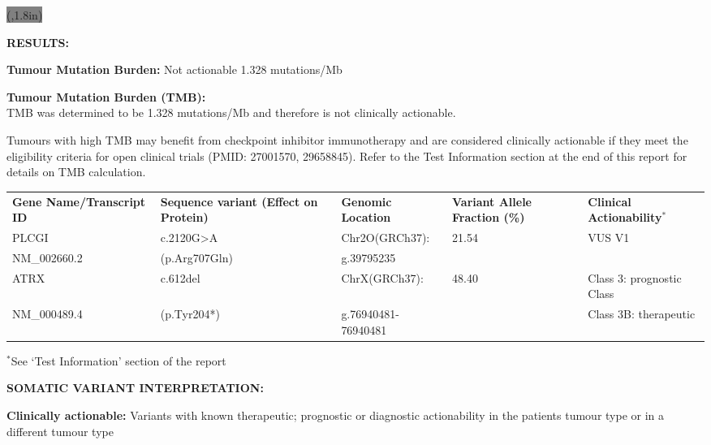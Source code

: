 \documentclass[8pt,letterpaper]{extarticle}
\begin{document}
\newpage

\colorbox{gray}{\makebox(\textwidth,1.8in){}}

{\bf \large RESULTS:}


{\bf Tumour Mutation Burden:}\hspace{2em} Not actionable \hspace{2em} 1.328 mutations/Mb

{\bf Tumour Mutation Burden (TMB):}\\
TMB was determined to be 1.328 mutations/Mb and therefore is not clinically actionable. 

Tumours with high TMB may benefit from checkpoint inhibitor immunotherapy and are considered clinically actionable if they meet the eligibility criteria for open clinical trials (PMID: 27001570, 29658845). Refer to the Test Information section at the end of this report for details on TMB calculation.

{\small
\begin{tabular}{p{3cm} p{3cm} p{3cm} p{3cm} p{3.5cm}}
\bf Gene Name/Transcript ID & \bf Sequence variant \newline (Effect on Protein) & \bf Genomic Location & \bf Variant Allele Fraction (\%) & \bf Clinical Actionability${}^\ast$\\
PLCGI  & c.2120G>A  & Chr2O(GRCh37): & 21.54 & VUS V1\\
NM\_002660.2 & (p.Arg707Gln)& g.39795235 & &\\
ATRX  &  c.612del   & ChrX(GRCh37): & 48.40 & Class 3: prognostic Class  \\
NM\_000489.4 & (p.Tyr204*) & g.76940481-76940481 & & Class 3B: therapeutic \\
\end{tabular}

${}^\ast$See `Test Information' section of the report
}

{\bf \large SOMATIC VARIANT INTERPRETATION:}

{\bf Clinically actionable:} Variants with known therapeutic; prognostic or diagnostic actionability in the patients tumour type or in a different tumour type
\end{document}
